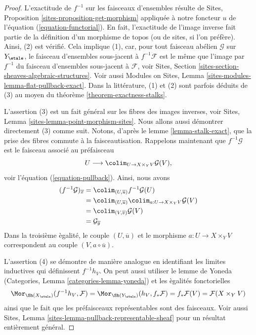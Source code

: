 \begin{proof}
L'exactitude de $f^{-1}$ sur les faisceaux d'ensembles r\'esulte de
Sites, Proposition \ref{sites-proposition-get-morphism}
appliqu\'ee \`a notre foncteur $u$ de l'\'equation (\ref{equation-functorial}).
En fait, l'exactitude de l'image inverse fait partie de la d\'efinition d'un
morphisme de topos (ou de sites, si l'on pr\'ef\`ere). Ainsi, (2) est v\'erifi\'e.
Cela implique (1), car, pour tout faisceau ab\'elien $\mathcal{G}$ sur
$Y_\etale$,
le faisceau d'ensembles sous-jacent \`a $f^{-1}\mathcal{F}$ est le m\^eme
que l'image par $f^{-1}$ du faisceau d'ensembles sous-jacent \`a $\mathcal{F}$, voir
Sites, Section \ref{sites-section-sheaves-algebraic-structures}.
Voir aussi
Modules on Sites, Lemma \ref{sites-modules-lemma-flat-pullback-exact}.
Dans la litt\'erature, (1) et (2) sont parfois d\'eduits de (3) au moyen du
th\'eor\`eme \ref{theorem-exactness-stalks}.

\medskip\noindent
L'assertion (3) est un fait g\'en\'eral sur les fibres des images inverses, voir
Sites, Lemma \ref{sites-lemma-point-morphism-sites}.
Nous allons aussi d\'emontrer directement (3) comme suit. Notons, d'apr\`es le
lemme \ref{lemma-stalk-exact},
que la prise des fibres commute \`a la faisceautisation.
Rappelons maintenant que $f^{-1}\mathcal{G}$ est le faisceau
associ\'e au pr\'efaisceau
$$
U \longrightarrow \colim_{U \to X \times_Y V} \mathcal{G}(V),
$$
voir l'\'equation (\ref{equation-pullback}).
Ainsi, nous avons
\begin{align*}
(f^{-1}\mathcal{G})_{\overline{x}}
& = \colim_{(U, \overline{u})} f^{-1}\mathcal{G}(U) \\
& = \colim_{(U, \overline{u})}
\colim_{a : U \to X \times_Y V} \mathcal{G}(V) \\
& = \colim_{(V, \overline{v})} \mathcal{G}(V) \\
& = \mathcal{G}_{\overline{y}}
\end{align*}
Dans la troisi\`eme \`egalit\'e, le couple $(U, \overline{u})$ et le morphisme
$a : U \to X \times_Y V$ correspondent au couple $(V, a \circ \overline{u})$.

\medskip\noindent
L'assertion (4) se d\'emontre de mani\`ere analogue en identifiant les limites inductives
qui d\'efinissent $f^{-1}h_V$. On peut aussi utiliser
le lemme de Yoneda (Categories, Lemma \ref{categories-lemma-yoneda})
et les \`egalit\'es fonctorielles
$$
\Mor_{\Sh(X_\etale)}(f^{-1}h_V, \mathcal{F}) =
\Mor_{\Sh(Y_\etale)}(h_V, f_*\mathcal{F}) =
f_*\mathcal{F}(V) = \mathcal{F}(X \times_Y V)
$$
ainsi que le fait que les pr\'efaisceaux repr\'esentables sont des faisceaux. Voir aussi
Sites, Lemma \ref{sites-lemma-pullback-representable-sheaf}
pour un r\'esultat enti\`erement g\'en\'eral.
\end{proof}

